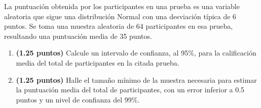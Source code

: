 
La puntuación obtenida por los participantes en una prueba es una variable aleatoria que sigue una distribución Normal con una desviación típica de 6 puntos. Se toma una muestra aleatoria de 64 participantes en esa prueba, resultando una puntuación media de 35 puntos.
\begin{enumerate}[label=\alph*)]
\item \textbf{(1.25 puntos)} Calcule un intervalo de confianza, al 95\%, para la calificación media del total de participantes en la citada prueba.
\item \textbf{(1.25 puntos)} Halle el tamaño mínimo de la muestra necesaria para estimar la puntuación media del total de participantes, con un error inferior a 0.5 puntos y un nivel de confianza del 99\%.
\end{enumerate}
